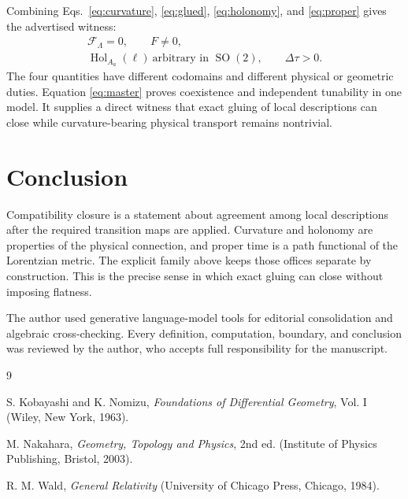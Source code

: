 \documentclass[aps,prd,reprint,nofootinbib,superscriptaddress]{revtex4-2}
\newcommand{\SO}{\operatorname{SO}}
\newcommand{\Hol}{\operatorname{Hol}}
\begin{document}
Combining Eqs.~\eqref{eq:curvature}, \eqref{eq:glued}, \eqref{eq:holonomy}, and \eqref{eq:proper} gives the advertised witness:
\begin{equation}
\boxed{
\begin{gathered}
\mathcal F_{\Lambda}=0,
\qquad
F\neq0,\\
\Hol_{A_a}(\ell)\ \text{arbitrary in }\SO(2),
\qquad
\Delta\tau>0.
\end{gathered}}
\label{eq:master}
\end{equation}
The four quantities have different codomains and different physical or geometric duties. Equation \eqref{eq:master} proves coexistence and independent tunability in one model. It supplies a direct witness that exact gluing of local descriptions can close while curvature-bearing physical transport remains nontrivial.

\section{Conclusion}

Compatibility closure is a statement about agreement among local descriptions after the required transition maps are applied. Curvature and holonomy are properties of the physical connection, and proper time is a path functional of the Lorentzian metric. The explicit family above keeps those offices separate by construction. This is the precise sense in which exact gluing can close without imposing flatness.

\begin{acknowledgments}
The author used generative language-model tools for editorial consolidation and algebraic cross-checking. Every definition, computation, boundary, and conclusion was reviewed by the author, who accepts full responsibility for the manuscript.
\end{acknowledgments}

\begin{thebibliography}{9}

S. Kobayashi and K. Nomizu,
\emph{Foundations of Differential Geometry}, Vol. I
(Wiley, New York, 1963).

M. Nakahara,
\emph{Geometry, Topology and Physics}, 2nd ed.
(Institute of Physics Publishing, Bristol, 2003).

R. M. Wald,
\emph{General Relativity}
(University of Chicago Press, Chicago, 1984).

\end{thebibliography}
\end{document}
